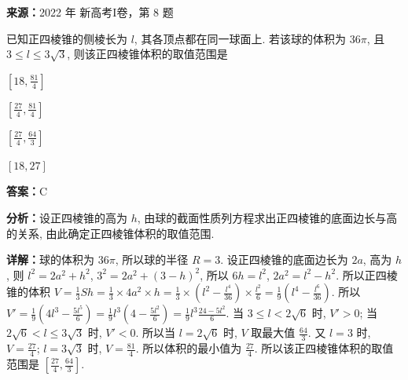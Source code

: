 \begin{question}[points=5]
\textbf{来源：}2022 年 新高考I卷，第 8 题\par
已知正四棱锥的侧棱长为 $l$, 其各顶点都在同一球面上. 若该球的体积为 $36\pi$, 且 $3 \le l \le 3\sqrt{3}$, 则该正四棱锥体积的取值范围是
\begin{choices}
  \item $\left[18, \frac{81}{4}\right]$
  \item $\left[\frac{27}{4}, \frac{81}{4}\right]$
  \item $\left[\frac{27}{4}, \frac{64}{3}\right]$
  \item $[18, 27]$
\end{choices}
\begin{solution}
\textbf{答案：}C

\textbf{分析：}设正四棱锥的高为 $h$, 由球的截面性质列方程求出正四棱锥的底面边长与高的关系, 由此确定正四棱锥体积的取值范围.

\textbf{详解：}球的体积为 $36\pi$, 所以球的半径 $R=3$. 设正四棱锥的底面边长为 $2a$, 高为 $h$, 则 $l^2 = 2a^2 + h^2$, $3^2 = 2a^2 + (3-h)^2$, 所以 $6h = l^2$, $2a^2 = l^2 - h^2$. 所以正四棱锥的体积 $V = \frac{1}{3}Sh = \frac{1}{3} \times 4a^2 \times h = \frac{1}{3} \times (l^2 - \frac{l^4}{36}) \times \frac{l^2}{6} = \frac{1}{9}\left(l^4 - \frac{l^6}{36}\right)$. 所以 $V' = \frac{1}{9}\left(4l^3 - \frac{5l^5}{6}\right) = \frac{1}{9}l^3\left(4 - \frac{5l^2}{6}\right) = \frac{1}{9}l^3\frac{24 - 5l^2}{6}$. 当 $3 \le l < 2\sqrt{6}$ 时, $V' > 0$; 当 $2\sqrt{6} < l \le 3\sqrt{3}$ 时, $V' < 0$. 所以当 $l = 2\sqrt{6}$ 时, $V$ 取最大值 $\frac{64}{3}$. 又 $l=3$ 时, $V = \frac{27}{4}$; $l=3\sqrt{3}$ 时, $V = \frac{81}{4}$. 所以体积的最小值为 $\frac{27}{4}$. 所以该正四棱锥体积的取值范围是 $\left[\frac{27}{4}, \frac{64}{3}\right]$.
\end{solution}
\end{question}

